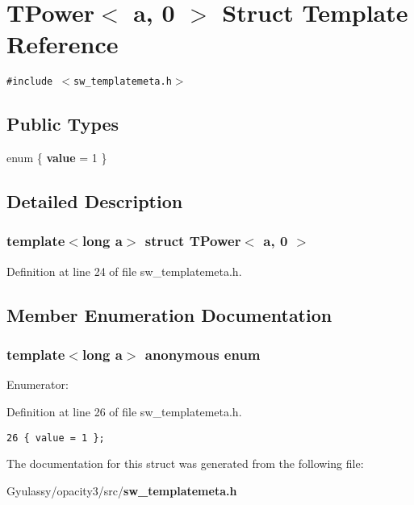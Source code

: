 \section{TPower$<$ a, 0 $>$ Struct Template Reference}
\label{structTPower_3_01a_00_010_01_4}
{\tt \#include $<$sw\_\-templatemeta.h$>$}

\subsection*{Public Types}
\begin{CompactItemize}
\item 
enum \{ {\bf value} =  1
 \}
\end{CompactItemize}


\subsection{Detailed Description}
\subsubsection*{template$<$long a$>$ struct TPower$<$ a, 0 $>$}



Definition at line 24 of file sw\_\-templatemeta.h.

\subsection{Member Enumeration Documentation}
\subsubsection{\setlength{\rightskip}{0pt plus 5cm}template$<$long a$>$ anonymous enum}\label{structTPower_3_01a_00_010_01_4_484d0b579efc1b23ba2ea067c2932f93}


\begin{Desc}
\item[Enumerator: ]\par
\begin{description}
\item[{\em 
value\label{structTPower_3_01a_00_010_01_4_484d0b579efc1b23ba2ea067c2932f9381891824da2f2a168c8b115fa771ed88}
}]\end{description}
\end{Desc}



Definition at line 26 of file sw\_\-templatemeta.h.

\begin{Code}\begin{verbatim}26 { value = 1 };
\end{verbatim}
\end{Code}




The documentation for this struct was generated from the following file:\begin{CompactItemize}
\item 
Gyulassy/opacity3/src/{\bf sw\_\-templatemeta.h}\end{CompactItemize}
